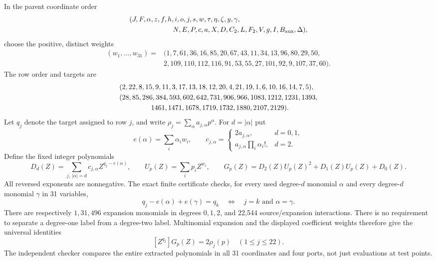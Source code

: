 In the parent coordinate order
\[
\begin{split}
 &(J,F,\alpha,z,f,h,i,o,j,s,w,\tau,\eta,\zeta,y,\gamma,\\
 &\hspace{22mm}N,E,P,c,a,X,D,C_2,L,F_2,V,g,I,B_{\rm aux},\Delta),
\end{split}
\]
choose the positive, distinct weights
\[
\begin{split}
 (w_1,\ldots,w_{31})={}&(1,7,61,36,16,85,20,67,43,11,34,13,96,80,29,50,\\
 &2,109,110,112,116,91,53,55,27,101,92,9,107,37,60).
\end{split}
\]
The row order and targets are
\[
\begin{split}
 &(2,22,8,15,9,11,3,17,13,18,12,20,4,21,19,1,6,10,16,14,7,5),\\
 &(28,85,286,384,593,602,642,731,906,966,1083,1212,1231,1393,\\
 &\hspace{16mm}1461,1471,1678,1719,1732,1880,2107,2129).
\end{split}
\]
Let $q_j$ denote the target assigned to row $j$, and write
$\rho_j=\sum_\alpha a_{j,\alpha}p^\alpha$. For $d=|\alpha|$ put
\[
 e(\alpha)=\sum_i\alpha_iw_i,\qquad
 c_{j,\alpha}=
 \begin{cases}2a_{j,\alpha},&d=0,1,\\
 a_{j,\alpha}\prod_i\alpha_i!,&d=2.
 \end{cases}
\]
Define the fixed integer polynomials
\[
 D_d(Z)=\sum_{j,\,|\alpha|=d}c_{j,\alpha}Z^{q_j-e(\alpha)},\qquad
 U_p(Z)=\sum_i p_iZ^{w_i},\qquad
 G_p(Z)=D_2(Z)U_p(Z)^2+D_1(Z)U_p(Z)+D_0(Z).
\]
All reversed exponents are nonnegative. The exact finite certificate checks,
for every used degree-$d$ monomial $\alpha$ and every degree-$d$ monomial
$\gamma$ in 31 variables,
\[
 q_j-e(\alpha)+e(\gamma)=q_k
 \quad\Longleftrightarrow\quad j=k\text{ and }\alpha=\gamma.
\]
There are respectively $1,31,496$ expansion monomials in degrees $0,1,2$,
and 22,544 source/expansion interactions. There is no requirement to
separate a degree-one label from a degree-two label. Multinomial expansion
and the displayed coefficient weights therefore give the universal identities
\begin{equation}\label{eq:sun-split-extraction}
 [Z^{q_j}]G_p(Z)=2\rho_j(p)\quad(1\le j\le22).
\end{equation}
The independent checker compares the entire extracted polynomials in all
31 coordinates and four ports, not just evaluations at test points.

